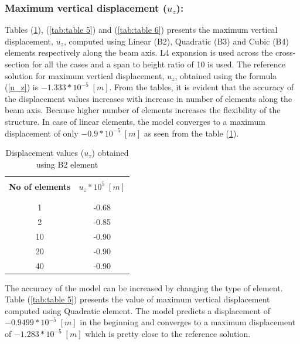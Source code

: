 \documentclass[a4paper,12pt]{article}
\begin{document}
\subsubsection*{Maximum vertical displacement ($u_{z}$):}
Tables (\ref{tab:table 4}), (\ref{tab:table 5}) and (\ref{tab:table 6}) presents the maximum vertical displacement, $u_{z}$, computed using Linear (B2), Quadratic (B3) and Cubic (B4) elements respectively along the beam axis. L4 expansion is used across the cross-section for all the cases and a span to height ratio of 10 is used. The reference solution for maximum vertical displacement, $u_{z}$, obtained using the formula (\ref{u_z}) is $-1.333*10^{-5}\;[m]$. From the tables, it is evident that the accuracy of the displacement values increases with increase in number of elements along the beam axis. Because higher number of elements increases the flexibility of the structure. In case of linear elements, the model converges to a maximum displacement of only $-0.9*10^{-5}\;[m]$ as seen from the table (\ref{tab:table 4}).
\begin{table}[h!]
  \begin{center}
     \begin{tabular}{c c}
      \hline\\
      \textbf{No of elements} & \textbf{$u_{z}*10^{5}\;[m]$} \\
      \\
      \hline
      \\[-2pt]
       1 & -0.68 \\[5pt]
       2 & -0.85 \\[5pt]
      10 & -0.90 \\[5pt]
      20 & -0.90 \\[5pt]
      40 & -0.90 \\[5pt]

      \hline
     \end{tabular}
    \caption{Displacement values ($u_{z}$) obtained using B2 element}
    \label{tab:table 4}
  \end{center}
\end{table}
\newpage
The accuracy of the model can be increased by changing the type of element. Table (\ref{tab:table 5}) presents the value of maximum vertical displacement computed using Quadratic element. The model predicts a displacement of $-0.9499*10^{-5}\;[m]$ in the beginning and converges to a maximum displacement of $-1.283*10^{-5}\;[m]$ which is pretty close to the reference solution.
\end{document}
